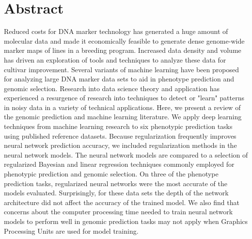 \chapter*{Abstract}

Reduced costs for DNA marker technology has generated a huge amount of
molecular data and made it economically feasible to generate dense
genome-wide marker maps of lines in a breeding program. Increased
data density and volume has driven an exploration of tools and techniques
to analyze these data for cultivar improvement. Several variants of
machine learning have been proposed for analyzing large DNA marker
data sets to aid in phenotype prediction and genomic selection.
Research into data science theory and application has experienced 
a resurgence of research into techniques to detect or "learn" patterns in noisy 
data in a variety of technical applications. 
Here, we present a review of the genomic prediction and machine learning literature. 
We apply deep learning techniques from machine learning research to six 
phenotypic prediction tasks using published reference datasets. Because regularization 
frequently improves neural network prediction accuracy, we included regularization 
methods in the neural network models. 
The neural network models are compared to a selection of regularized Bayesian and 
linear regression techniques commonly employed for phenotypic prediction and 
genomic selection. On three of the phenotype prediction tasks, regularized neural networks 
were the most accurate of the models evaluated. Surprisingly, for these data sets the
depth of the network architecture did not affect the accuracy of 
the trained model. We also find that concerns about the computer processing 
time needed to train neural network models to perform well in genomic prediction 
tasks may not apply when Graphics Processing Units are used for model training.



